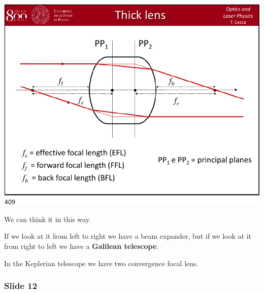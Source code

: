 \documentclass[../main/main.tex]{subfiles}
\begin{document}
\begin{minipage}[]{0.5\linewidth}
\centering
\includegraphics[page=11,width=1\textwidth]{../lessons/pdf_file/20_lecture.pdf}
\end{minipage}
\hspace{0.3cm}\vspace{0.3cm}
\begin{minipage}[c]{0.47\linewidth}

We can think it in this way.

If we look at it from left to right we have a beam expander, but if we look at it from right to left we have a \textbf{Galilean telescope}.

In the Keplerian telescope we have two convergence focal lens.

\end{minipage}

\subsubsection*{Slide 12}
\end{document}
